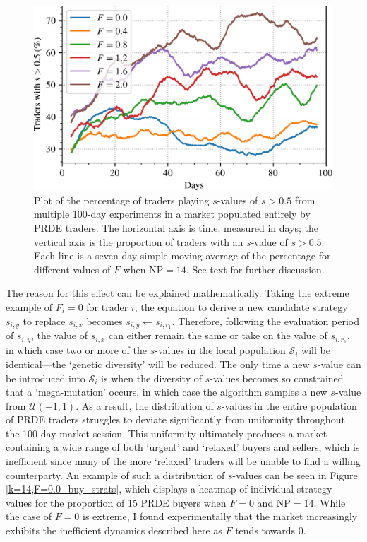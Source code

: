\documentclass[a4paper,twoside]{article}
\begin{document}
\begin{figure}[htbp]
    \centerline{\includegraphics[width=\columnwidth]{k=14_strats.png}}
    \caption{
        Plot of the percentage of traders playing $s$-values of $s>0.5$ from multiple 100-day experiments in a market populated entirely by PRDE traders.
        The horizontal axis is time, measured in days; the vertical axis is the proportion of traders with an $s$-value of $s>0.5$.
        Each line is a seven-day simple moving average of the percentage for different values of $F$ when $\mathrm{NP}=14$.
        See text for further discussion.
    }
    \label{k=14_strats}
\end{figure}

The reason for this effect can be explained mathematically.
Taking the extreme example of $F_i=0$ for trader $i$, the equation to derive a new candidate strategy $s_{i,y}$ to replace $s_{i,x}$ becomes $s_{i,y}\leftarrow s_{i,r_1}$.
Therefore, following the evaluation period of $s_{i,y}$, the value of $s_{i,x}$ can either remain the same or take on the value of $s_{i,r_1}$, in which case two or more of the $s$-values in the local population $\mathcal{S}_i$ will be identical---the `genetic diversity' will be reduced.
The only time a new $s$-value can be introduced into $\mathcal{S}_i$ is when the diversity of $s$-values becomes so constrained that a `mega-mutation' occurs, in which case the algorithm samples a new $s$-value from $\mathcal{U}(-1,1)$.
As a result, the distribution of $s$-values in the entire population of PRDE traders struggles to deviate significantly from uniformity throughout the 100-day market session.
This uniformity ultimately produces a market containing a wide range of both `urgent' and `relaxed' buyers and sellers, which is inefficient since many of the more `relaxed' traders will be unable to find a willing counterparty.
An example of such a distribution of $s$-values can be seen in Figure \ref{k=14,F=0.0_buy_strats}, which displays a heatmap of individual strategy values for the proportion of 15 PRDE buyers when $F=0$ and $\mathrm{NP}=14$.
While the case of $F=0$ is extreme, I found experimentally that the market increasingly exhibits the inefficient dynamics described here as $F$ tends towards $0$.
\end{document}
